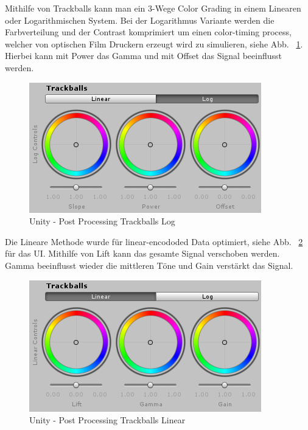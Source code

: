 Mithilfe von Trackballs kann man ein 3-Wege Color Grading in einem Linearen oder Logarithmischen System.
Bei der Logarithmus Variante werden die Farbverteilung und der Contrast komprimiert um einen color-timing process, welcher von optischen Film Druckern erzeugt wird zu simulieren, siehe Abb. ~\ref{fig:unity-post-processing-trackballs-log}.
Hierbei kann mit Power das Gamma und mit Offset das Signal beeinflusst werden.
\begin {figure}
    \centering
    \includegraphics[scale=0.9]{pics/unity-post-processing-trackballs-log}
    \caption{Unity - Post Processing Trackballs Log}
    \label{fig:unity-post-processing-trackballs-log}
\end {figure}
Die Lineare Methode wurde für linear-encododed Data optimiert, siehe Abb. ~\ref{fig:unity-post-processing-trackballs-linear} für das UI.
Mithilfe von Lift kann das gesamte Signal verschoben werden.
Gamma beeinflusst wieder die mittleren Töne und Gain verstärkt das Signal.
\begin {figure}
    \centering
    \includegraphics[scale=0.9]{pics/unity-post-processing-trackballs-linear}
    \caption{Unity - Post Processing Trackballs Linear}
    \label{fig:unity-post-processing-trackballs-linear}
\end {figure}

